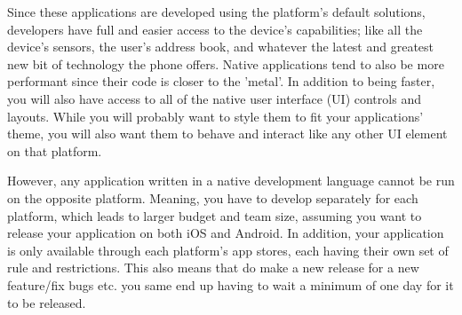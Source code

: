 Since these applications are developed using the platform's default solutions, developers have full and easier access to the device's capabilities; like all the device's sensors, the user's address book, and whatever the latest and greatest new bit of technology the phone offers. Native applications tend to also be more performant since their code is closer to the 'metal'. In addition to being faster, you will also have access to all of the native user interface (UI) controls and layouts. While you will probably want to style them to fit your applications' theme, you will also want them to behave and interact like any other UI element on that platform.\newline

However, any application written in a native development language cannot be run on the opposite platform. Meaning, you have to develop separately for each platform, which leads to larger budget and team size, assuming you want to release your application on both iOS and Android. In addition, your application is only available through each platform's app stores, each having their own set of rule and restrictions. This also means that do make a new release for a new feature/fix bugs etc. you same end up having to wait a minimum of one day for it to be released.

